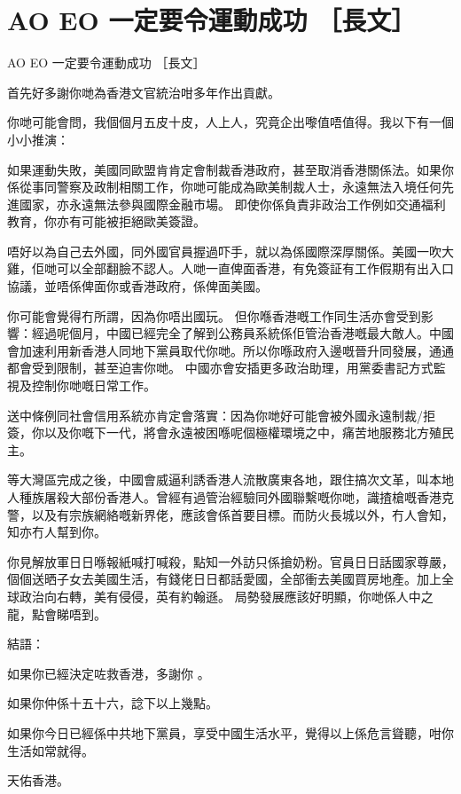 \chapter{AO EO 一定要令運動成功 ［長文］}

AO EO 一定要令運動成功 ［長文］

首先好多謝你哋為香港文官統治咁多年作出貢獻。

你哋可能會問，我個個月五皮十皮，人上人，究竟企出嚟值唔值得。我以下有一個小小推演：

如果運動失敗，美國同歐盟肯肯定會制裁香港政府，甚至取消香港關係法。如果你係從事同警察及政制相關工作，你哋可能成為歐美制裁人士，永遠無法入境任何先進國家，亦永遠無法參與國際金融市場。 即使你係負責非政治工作例如交通福利教育，你亦有可能被拒絕歐美簽證。

唔好以為自己去外國，同外國官員握過吓手，就以為係國際深厚關係。美國一吹大雞，佢哋可以全部翻臉不認人。人哋一直俾面香港，有免簽証有工作假期有出入口協議，並唔係俾面你或香港政府，係俾面美國。

你可能會覺得冇所謂，因為你唔出國玩。 但你喺香港嘅工作同生活亦會受到影響：經過呢個月，中國已經完全了解到公務員系統係佢管治香港嘅最大敵人。中國會加速利用新香港人同地下黨員取代你哋。所以你喺政府入邊嘅晉升同發展，通通都會受到限制，甚至迫害你哋。 中國亦會安插更多政治助理，用黨委書記方式監視及控制你哋嘅日常工作。

送中條例同社會信用系統亦肯定會落實：因為你哋好可能會被外國永遠制裁/拒簽，你以及你嘅下一代，將會永遠被困喺呢個極權環境之中，痛苦地服務北方殖民主。

等大灣區完成之後，中國會威逼利誘香港人流散廣東各地，跟住搞次文革，叫本地人種族屠殺大部份香港人。曾經有過管治經驗同外國聯繫嘅你哋，識揸槍嘅香港克警，以及有宗族網絡嘅新界佬，應該會係首要目標。而防火長城以外，冇人會知，知亦冇人幫到你。

你見解放軍日日喺報紙喊打喊殺，點知一外訪只係搶奶粉。官員日日話國家尊嚴，個個送晒子女去美國生活，有錢佬日日都話愛國，全部衝去美國買房地產。加上全球政治向右轉，美有侵侵，英有約翰遜。 局勢發展應該好明顯，你哋係人中之龍，點會睇唔到。

結語：

如果你已經決定咗救香港，多謝你 。

如果你仲係十五十六，諗下以上幾點。

如果你今日已經係中共地下黨員，享受中國生活水平，覺得以上係危言聳聽，咁你生活如常就得。

天佑香港。

